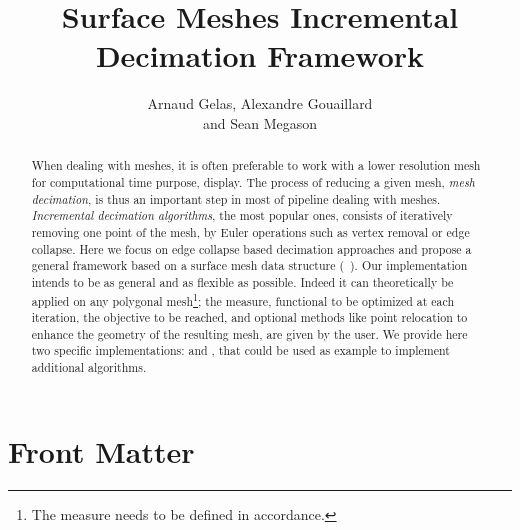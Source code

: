 \documentclass{InsightArticle}
\title{Surface Meshes Incremental\\
Decimation Framework}
\author{Arnaud Gelas, Alexandre Gouaillard\\
and Sean Megason}
\theoremstyle{plain}
\begin{document}
\ifpdf
\else
\fi


\maketitle


\ifhtml
\chapter*{Front Matter\label{front}}
\fi


\begin{abstract}
\noindent
When dealing with meshes, it is often preferable to work with a lower resolution mesh for computational time purpose, display. The process of reducing a given mesh, \emph{mesh decimation}, is thus an important step in most of pipeline dealing with meshes. \emph{Incremental decimation algorithms}, the most popular ones, consists of iteratively removing one point of the mesh, by Euler operations such as vertex removal or edge collapse. Here we focus on edge collapse based decimation approaches and propose a general framework based on a surface mesh data structure (~\cite{itkQE}). Our implementation intends to be as general and as flexible as possible. Indeed it can theoretically be applied on any polygonal mesh\footnote{The measure needs to be defined in accordance.}; the measure, functional to be optimized at each iteration, the objective to be reached, and optional methods like point relocation to enhance the geometry of the resulting mesh, are given by the user. We provide here two specific implementations:  and , that could be used as example to implement additional algorithms.
\end{abstract}

\tableofcontents
\end{document}
